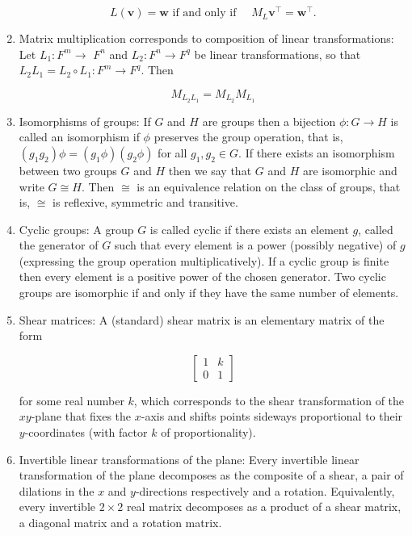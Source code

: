 \documentclass{article}
\begin{document}
\begin{enumerate}
        $$
        L(\mathbf{v})=\mathbf{w} \text { if and only if } \quad M_{L} \mathbf{v}^{\top}=\mathbf{w}^{\top} .
        $$

        \item Matrix multiplication corresponds to composition of linear transformations: Let $L_{1}: F^{m} \rightarrow$ $F^{n}$ and $L_{2}: F^{n} \rightarrow F^{q}$ be linear transformations, so that $L_{2} L_{1}=L_{2} \circ L_{1}: F^{m} \rightarrow F^{q}$. Then

        $$
        M_{L_{2} L_{1}}=M_{L_{2}} M_{L_{1}}
        $$

        \item Isomorphisms of groups: If $G$ and $H$ are groups then a bijection $\phi: G \rightarrow H$ is called an isomorphism if $\phi$ preserves the group operation, that is, $\left(g_{1} g_{2}\right) \phi=\left(g_{1} \phi\right)\left(g_{2} \phi\right)$ for all $g_{1}, g_{2} \in G$. If there exists an isomorphism between two groups $G$ and $H$ then we say that $G$ and $H$ are isomorphic and write $G \cong H$. Then $\cong$ is an equivalence relation on the class of groups, that is, $\cong$ is reflexive, symmetric and transitive.

        \item Cyclic groups: A group $G$ is called cyclic if there exists an element $g$, called the generator of $G$ such that every element is a power (possibly negative) of $g$ (expressing the group operation multiplicatively). If a cyclic group is finite then every element is a positive power of the chosen generator. Two cyclic groups are isomorphic if and only if they have the same number of elements.

        \item Shear matrices: A (standard) shear matrix is an elementary matrix of the form

        $$
        \left[\begin{array}{ll}
        1 & k \\
        0 & 1
        \end{array}\right]
        $$

        for some real number $k$, which corresponds to the shear transformation of the $x y$-plane that fixes the $x$-axis and shifts points sideways proportional to their $y$-coordinates (with factor $k$ of proportionality).

        \item Invertible linear transformations of the plane: Every invertible linear transformation of the plane decomposes as the composite of a shear, a pair of dilations in the $x$ and $y$-directions respectively and a rotation. Equivalently, every invertible $2 \times 2$ real matrix decomposes as a product of a shear matrix, a diagonal matrix and a rotation matrix.

    \end{enumerate}
\end{document}
